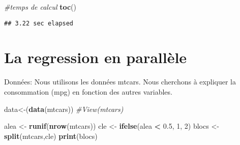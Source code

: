 \documentclass[
]{article}
\newenvironment{Shaded}{\begin{snugshade}}{\end{snugshade}}
\newcommand{\CommentTok}[1]{\textcolor[rgb]{0.56,0.35,0.01}{\textit{#1}}}
\newcommand{\DecValTok}[1]{\textcolor[rgb]{0.00,0.00,0.81}{#1}}
\newcommand{\FloatTok}[1]{\textcolor[rgb]{0.00,0.00,0.81}{#1}}
\newcommand{\FunctionTok}[1]{\textcolor[rgb]{0.13,0.29,0.53}{\textbf{#1}}}
\newcommand{\NormalTok}[1]{#1}
\newcommand{\OtherTok}[1]{\textcolor[rgb]{0.56,0.35,0.01}{#1}}
\newcommand{\SpecialCharTok}[1]{\textcolor[rgb]{0.81,0.36,0.00}{\textbf{#1}}}
\begin{document}
\begin{Shaded}
\begin{Highlighting}[]
\CommentTok{\#temps de calcul}
\FunctionTok{toc}\NormalTok{()}
\end{Highlighting}
\end{Shaded}

\begin{verbatim}
## 3.22 sec elapsed
\end{verbatim}

\hypertarget{la-regression-en-paralluxe8le}{%
\section{La regression en
parallèle}\label{la-regression-en-paralluxe8le}}

Données: Nous utilisons les données mtcars. Nous cherchons à expliquer
la consommation (mpg) en fonction des autres variables.

\begin{Shaded}
\begin{Highlighting}[]
\NormalTok{data}\OtherTok{\textless{}{-}}\NormalTok{(}\FunctionTok{data}\NormalTok{(mtcars))}
\CommentTok{\#View(mtcars)}
\end{Highlighting}
\end{Shaded}

\begin{Shaded}
\begin{Highlighting}[]
\NormalTok{alea }\OtherTok{\textless{}{-}} \FunctionTok{runif}\NormalTok{(}\FunctionTok{nrow}\NormalTok{(mtcars))}
\NormalTok{cle }\OtherTok{\textless{}{-}} \FunctionTok{ifelse}\NormalTok{(alea }\SpecialCharTok{\textless{}} \FloatTok{0.5}\NormalTok{, }\DecValTok{1}\NormalTok{, }\DecValTok{2}\NormalTok{)}
\NormalTok{blocs }\OtherTok{\textless{}{-}} \FunctionTok{split}\NormalTok{(mtcars,cle)}
\FunctionTok{print}\NormalTok{(blocs)}
\end{Highlighting}
\end{Shaded}
\end{document}
